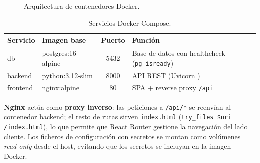 \documentclass[12pt,twoside,titlepage]{report}
\begin{document}
\begin{figure}[H]
  \centering
  \caption{Arquitectura de contenedores Docker.}
  \label{fig:docker}
\end{figure}

\begin{table}[H]
  \centering
  \caption{Servicios Docker Compose.}
  \label{tab:docker}
  \begin{tabular}{llcl}
    \toprule
    \textbf{Servicio} & \textbf{Imagen base} & \textbf{Puerto} & \textbf{Función} \\
    \midrule
    db       & postgres:16-alpine & 5432 & Base de datos con healthcheck (\texttt{pg\_isready}) \\
    backend  & python:3.12-slim   & 8000 & API REST (Uvicorn \cite{uvicorn}) \\
    frontend & nginx:alpine       & 80   & SPA + reverse proxy \texttt{/api} \\
    \bottomrule
  \end{tabular}
\end{table}

\textbf{Nginx} actúa como \textbf{proxy inverso}: las peticiones a \texttt{/api/*} se reenvían al contenedor backend; el resto de rutas sirven \texttt{index.html} (\texttt{try\_files \$uri /index.html}), lo que permite que React Router gestione la navegación del lado cliente. Los ficheros de configuración con secretos se montan como volúmenes \emph{read-only} desde el host, evitando que los secretos se incluyan en la imagen Docker.
\end{document}
